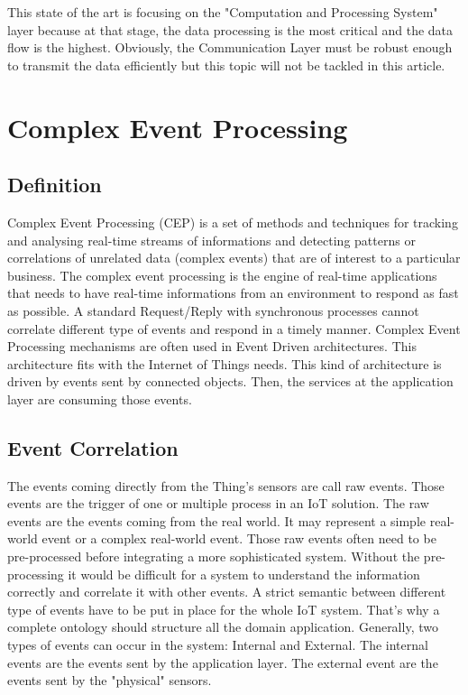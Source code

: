 \documentclass[11pt]{article}
\begin{document}
This state of the art is focusing on the "Computation and Processing System" layer because at that stage, the data processing is the most critical and the data flow is the highest. Obviously, the Communication Layer must be robust enough to transmit the data efficiently but this topic will not be tackled in this article.


\section{Complex Event Processing} \label{cep}

\subsection{Definition}

Complex Event Processing (CEP) is a set of methods and techniques for tracking
and analysing real-time streams of informations and detecting patterns or correlations
of unrelated data (complex events) that are of interest to a particular
business. \cite{1} The complex event processing is the engine of real-time applications that needs to have real-time informations from an environment to respond as fast as possible. A standard Request/Reply with synchronous processes cannot correlate different type of events and respond in a timely manner. Complex Event Processing mechanisms are often used in Event Driven architectures. This architecture fits with the Internet of Things needs. This kind of architecture is driven by events sent by connected objects. Then, the services at the application layer are consuming those events.

\subsection{Event Correlation}

The events coming directly from the Thing's sensors are call raw events. Those events are the trigger of one or multiple process in an IoT solution. The raw events are the events coming from the real world. It may represent a simple real-world event or a complex real-world event. Those raw events often need to be pre-processed before integrating a more sophisticated system. Without the pre-processing it would be difficult for a system to understand the information correctly and correlate it with other events. A strict semantic between different type of events have to be put in place for the whole IoT system. That's why a complete ontology should structure all the domain application. Generally, two types of events can occur in the system: Internal and External. The internal events are the events sent by the application layer. The external event are the events sent by the "physical" sensors.
\end{document}
